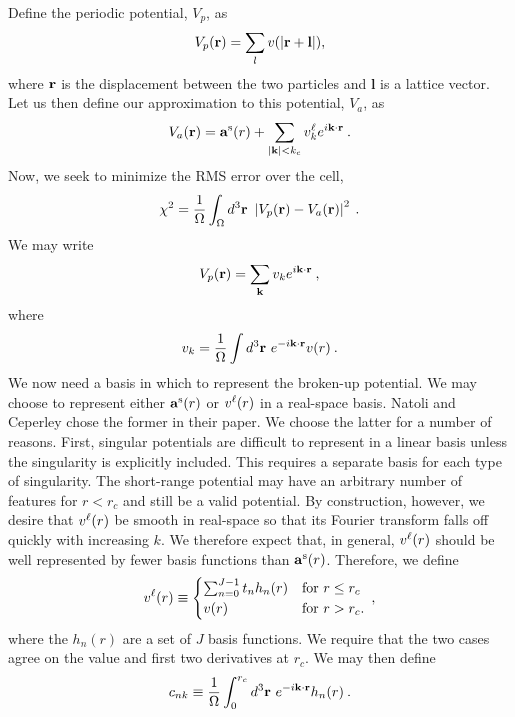 Define the periodic potential, $V_p$, as 
\begin{equation}
V_p(\mathbf{r}) = \sum_l v(|\mathbf{r} + \mathbf{l}|),
\end{equation}
where $\mathbf{r}$ is the displacement between the two particles and
$\mathbf{l}$ is a lattice vector.  Let us then define our
approximation to this potential, $V_a$, as
\begin{equation}
V_a(\mathbf{r}) = \mathbf{a}^{\text{s}}(r) + \sum_{|\mathbf{k}| < k_c} v^\ell_k e^{i\mathbf {\mathbf{k}} \cdot \mathbf{r}}\:.
\end{equation}
Now, we seek to minimize the RMS error over the cell,
\begin{equation}
\chi^2 = \frac{1}{\Omega}\int_\Omega d^3 \mathbf{r} \ 
\left| V_p(\vr) - V_a(\vr)\right|^2\:. 
\end{equation}
We may write
\begin{equation}
V_p(\mathbf{r}) = \sum_{\mathbf{k}} v_k e^{i \mathbf{k} \cdot \mathbf{r}}\:,
\end{equation}
where 
\begin{equation}
v_k = \frac{1}{\Omega} \int d^3\mathbf{r} \ e^{-i\mathbf{k}\cdot\mathbf{r}}v(r)\:.
\end{equation}
We now need a basis in which to represent the broken-up potential.  We
may choose to represent either $\mathbf{a}^{\text{s}}(r)$ or $v^\ell(r)$ in a real-space
basis.  Natoli and Ceperley chose the former in their paper.  We choose
the latter for a number of reasons.  First, singular potentials are
difficult to represent in a linear basis unless the singularity is
explicitly included.  This requires a separate basis for each type of
singularity.  The short-range potential may have an arbitrary number
of features for $r<r_c$ and still be a valid potential.  By
construction, however, we desire that $v^\ell(r)$ be smooth in real-space
so that its Fourier transform falls off quickly with increasing $k$.
We therefore expect that, in general, $v^\ell(r)$ should be
well represented by fewer basis functions than $\mathbf{a}^{\text{s}}(r)$.  Therefore,
we define
\begin{equation}
v^\ell(r) \equiv
\begin{cases}
 \sum_{n=0}^{J-1} t_n h_n(r) & \text{for } r \le r_c \\
 v(r) & \text{for } r > r_c.
\end{cases}\:,
\end{equation}
where the $h_n(r)$ are a set of $J$ basis functions.  We require that
the two cases agree on the value and first two derivatives at $r_c$.
We may then define
\begin{equation}
c_{nk} \equiv \frac{1}{\Omega} \int_0^{r_c} d^3 \mathbf{r} \ e^{-i\mathbf{k}\cdot\mathbf{r}} h_n(r)\:.
\end{equation}
